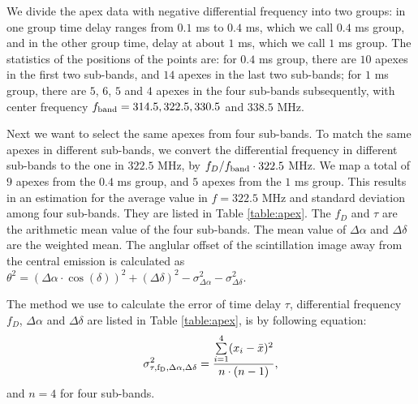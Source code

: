 \documentclass[useAMS,usenatbib]{mn2e}
\begin{document}
We divide the apex data with negative differential frequency into two groups: in one group time delay ranges from $0.1$ ms to $0.4$ ms, which we call $0.4$ ms group, and in the other group time, delay at about $1$ ms, which we call $1$ ms group. The statistics of the positions of the points are: for $0.4$ ms group, there are $10$ apexes in the first two sub-bands, and $14$ apexes in the last two sub-bands; for $1$ ms group, there are $5$, $6$, $5$ and $4$ apexes in the four sub-bands subsequently, with center frequency $f_{\rm band}=314.5, 322.5, 330.5$ and $ 338.5$ MHz. 

Next we want to select the same apexes from four sub-bands. To match the same apexes in different sub-bands, we convert the differential frequency in different sub-bands to the one in $322.5$ MHz, by $f_D/f_{\rm band}\cdot322.5$ MHz. We map
a total of $9$ apexes from the $0.4$ ms group, and $5$ apexes from the $1$ ms
group. This results in an estimation
for the average value in $f=322.5$ MHz and standard deviation among four sub-bands. They are listed in Table
\ref{table:apex}. The $f_D$ and $\tau$ are the arithmetic mean value of the four sub-bands. 
The mean value of $\Delta\alpha$ and $\Delta\delta$ are the weighted mean.
The anglular offset of the scintillation image away from the central emission is calculated as ${\theta}^2=({\Delta\alpha}\cdot\cos(\delta))^2+({\Delta\delta})^2-\sigma^2_{\Delta\alpha}-\sigma^2_{\Delta\delta}$. 

The method we use to calculate the error of time delay $\tau$, differential frequency $f_D$, $\Delta\alpha$ and $\Delta\delta$ are listed in Table \ref{table:apex}, is by following equation:
\begin{equation}
\begin{aligned}
\sigma^2_{\rm \tau, f_D,\Delta\alpha, \Delta\delta} = \frac{\sum\limits^{4}_{i=1}(x_i-\bar{x})^2}{n\cdot(n-1)},
\end{aligned}
\end{equation}
and $n=4$ for four sub-bands.

\end{document}
